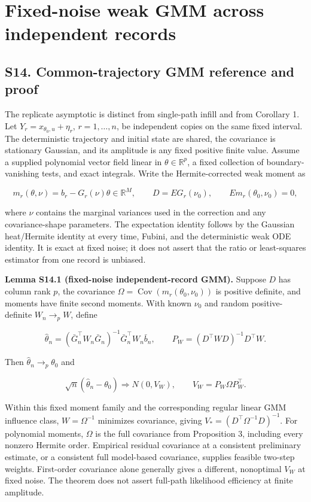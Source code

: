 \documentclass[
  11pt,
]{article}
\author{}
\date{}
\begin{document}
\section{Fixed-noise weak GMM across independent
records}\label{fixed-noise-weak-gmm-across-independent-records}

\subsection{S14. Common-trajectory GMM reference and
proof}\label{s14.-common-trajectory-gmm-reference-and-proof}

The replicate asymptotic is distinct from single-path infill and from
Corollary 1. Let \(Y_r=x_{\theta_0,u}+\eta_r\), \(r=1,\ldots,n\), be
independent copies on the same fixed interval. The deterministic
trajectory and initial state are shared, the covariance is stationary
Gaussian, and its amplitude is any fixed positive finite value. Assume a
supplied polynomial vector field linear in \(\theta\in\mathbb R^p\), a
fixed collection of boundary-vanishing tests, and exact integrals. Write
the Hermite-corrected weak moment as

\[
m_r(\theta,\nu)=b_r-G_r(\nu)\theta\in\mathbb R^M,
\qquad D=E G_r(\nu_0),\qquad E m_r(\theta_0,\nu_0)=0,
\]

where \(\nu\) contains the marginal variances used in the correction and
any covariance-shape parameters. The expectation identity follows by the
Gaussian heat/Hermite identity at every time, Fubini, and the
deterministic weak ODE identity. It is exact at fixed noise; it does not
assert that the ratio or least-squares estimator from one record is
unbiased.

\textbf{Lemma S14.1 (fixed-noise independent-record GMM).} Suppose \(D\)
has column rank \(p\), the covariance
\(\Omega=\operatorname{Cov}(m_r(\theta_0,\nu_0))\) is positive definite,
and moments have finite second moments. With known \(\nu_0\) and random
positive-definite \(W_n\to_p W\), define

\[
\widehat\theta_n=(\bar G_n^\top W_n\bar G_n)^{-1}\bar G_n^\top W_n\bar b_n,
\qquad P_W=(D^\top W D)^{-1}D^\top W.
\]

Then \(\widehat\theta_n\to_p\theta_0\) and

\[
\sqrt n(\widehat\theta_n-\theta_0)\Rightarrow N(0,V_W),
\qquad V_W=P_W\Omega P_W^\top.
\]

Within this fixed moment family and the corresponding regular linear GMM
influence class, \(W=\Omega^{-1}\) minimizes covariance, giving
\(V_*=(D^\top\Omega^{-1}D)^{-1}\). For polynomial moments, \(\Omega\) is
the full covariance from Proposition 3, including every nonzero Hermite
order. Empirical residual covariance at a consistent preliminary
estimate, or a consistent full model-based covariance, supplies feasible
two-step weights. First-order covariance alone generally gives a
different, nonoptimal \(V_W\) at fixed noise. The theorem does not
assert full-path likelihood efficiency at finite amplitude.
\end{document}
